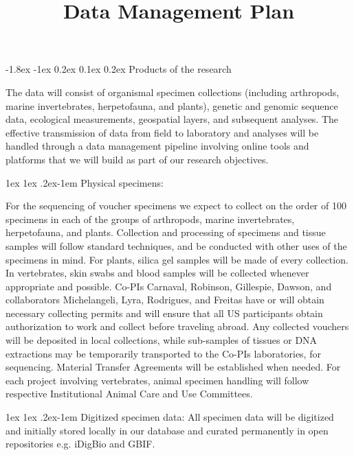 \documentclass[11pt]{article}
\title{Data Management Plan \vspace{-1.5ex}}
\author{}
\date{}
\makeatletter
\renewcommand\section{\@startsection{section}{1}{\z@}%
                                  {-1.8ex \@plus -1ex \@minus 0.2ex}%
                                  {0.1ex \@plus 0.2ex}%
                                  {\normalfont\Large\bfseries}}
\renewcommand{\paragraph}{\@startsection{paragraph}{4}{\z@}
  {1ex \@plus 1ex \@minus .2ex}{-1em}
  {\normalfont\normalsize\bf}
}
\makeatother
\begin{document}
\maketitle
\thispagestyle{fancy} 
\vspace{-6em}

\section{Products of the research} 

The data will consist of organismal specimen collections (including arthropods, marine invertebrates, herpetofauna, and plants), genetic and genomic sequence data, ecological measurements, geospatial layers, and subsequent analyses. The effective transmission of data from field to laboratory and analyses will be handled through a data management pipeline involving online tools and platforms that we will build as part of our research objectives.

\paragraph{Physical specimens:} 

For the sequencing of voucher specimens we expect to collect on the order of 100 specimens in each of the groups of arthropods, marine invertebrates, herpetofauna, and plants.  Collection and processing of specimens and tissue samples will follow standard techniques, and be conducted with other uses of the specimens in mind.  For plants, silica gel samples will be made of every collection. In vertebrates, skin swabs and blood samples will be collected whenever appropriate and possible. Co-PIs Carnaval, Robinson, Gillespie, Dawson, and collaborators Michelangeli, Lyra, Rodrigues, and Freitas have or will obtain necessary collecting permits and will ensure that all US participants obtain authorization to work and collect before traveling abroad. Any collected vouchers will be deposited in local collections, while sub-samples of tissues or DNA extractions may be temporarily transported to the Co-PIs laboratories, for sequencing. Material Transfer Agreements will be established when needed. For each project involving vertebrates, animal specimen handling will follow respective Institutional Animal Care and Use Committees.

\paragraph{Digitized specimen data:} 
All specimen data will be digitized and initially stored locally in our database and curated permanently in open repositories e.g. iDigBio and GBIF.  
\end{document}
